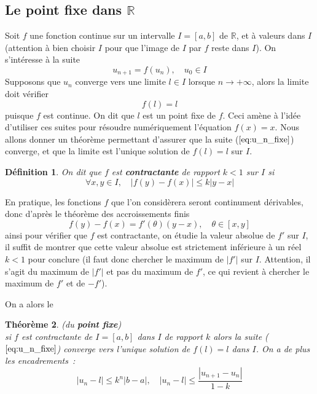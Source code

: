 \documentclass[a4paper,11pt]{book}
\newtheorem{thm}{Théorème}
\newtheorem{defn}[thm]{D\'efinition}
\begin{document}
\begin{giacjshere}
\section{Le point fixe dans $\mathbb{R}$} 
Soit $f$ une fonction continue sur un intervalle $I=[a,b]$ de $\mathbb{R}$, et 
à valeurs dans $I$ (attention à bien choisir $I$ pour que l'image
de $I$ par $f$ reste dans $I$).
On s'intéresse à la suite 
\begin{equation} \label{eq:u_n_fixe}
 u_{n+1}=f(u_n), \quad u_0 \in I 
\end{equation}
Supposons que $u_n$ converge vers une limite $l \in I$ lorsque
$n \rightarrow +\infty$, alors la limite doit vérifier
\[ f(l)=l \]
puisque $f$ est continue. On dit que $l$ est un point fixe de $f$.
Ceci amène à l'idée d'utiliser ces suites pour résoudre numériquement
l'équation $f(x)=x$. Nous allons donner un théorème permettant
d'assurer que la suite (\(\ref{eq:u_n_fixe}\)) converge, et que la limite
est l'unique solution de $f(l)=l$ sur $I$.

\begin{defn}
On dit que $f$ est {\bf contractante} de rapport $k<1$ sur $I$ si
\[ \forall x,y \in I, \quad |f(y)-f(x)| \leq k |y-x| \]
\end{defn}

En pratique, les fonctions $f$ que l'on considèrera seront continument
dérivables, donc d'après le théorème des accroissements finis
\[ f(y)-f(x)=f'(\theta) (y-x), \quad \theta \in [x,y] \]
ainsi pour vérifier que $f$ est contractante, on étudie la valeur absolue
de $f'$ sur $I$, il suffit de montrer que cette valeur absolue
est strictement inférieure à un réel $k<1$ pour conclure (il faut
donc chercher le maximum de $|f'|$ sur $I$. Attention, il s'agit du
maximum de $|f'|$ et pas du maximum de $f'$, ce qui revient à chercher
le maximum de $f'$ et de $-f'$).

On a alors le 
\begin{thm} (du {\bf point fixe})\\
si $f$ est contractante de $I=[a,b]$
dans $I$ de rapport $k$ 
alors la suite (\(\ref{eq:u_n_fixe}\)) converge vers l'unique
solution de $f(l)=l$ dans $I$. On a de plus les encadrements~:
\begin{equation}  \label{eq:u_n_l}
|u_n-l| \leq k^n |b-a|, \quad
|u_n -l | \leq \frac{|u_{n+1}-u_n|}{1-k} 
\end{equation}
\end{thm}


\end{giacjshere}
\end{document}
